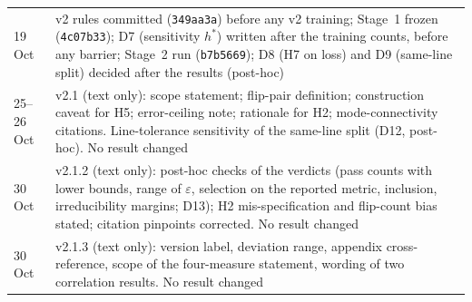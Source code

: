 \documentclass[11pt]{article}
\newcommand{\eps}{\varepsilon}
\begin{document}
\begin{table}[H]
\begin{tabularx}{\linewidth}{@{}lX@{}}
19 Oct & v2 rules committed (\texttt{349aa3a}) before any v2 training; Stage~1 frozen (\texttt{4c07b33}); D7 (sensitivity $h^*$) written after the training counts, before any barrier; Stage~2 run (\texttt{b7b5669}); D8 (H7 on loss) and D9 (same-line split) decided after the results (post-hoc) \\
25--26 Oct & v2.1 (text only): scope statement; flip-pair definition; construction caveat for H5; error-ceiling note; rationale for H2; mode-connectivity citations. Line-tolerance sensitivity of the same-line split (D12, post-hoc). No result changed \\
30 Oct & v2.1.2 (text only): post-hoc checks of the verdicts (pass counts with lower bounds, range of $\eps$, selection on the reported metric, inclusion, irreducibility margins; D13); H2 mis-specification and flip-count bias stated; citation pinpoints corrected. No result changed \\
30 Oct & v2.1.3 (text only): version label, deviation range, appendix cross-reference, scope of the four-measure statement, wording of two correlation results. No result changed \\
\bottomrule
\end{tabularx}
\end{table}
\end{document}
